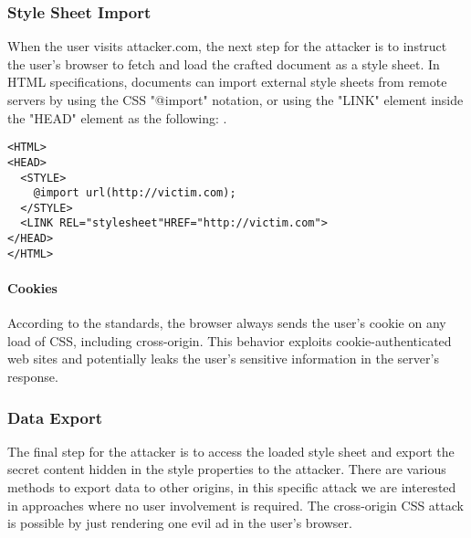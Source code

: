 \documentclass{acm_proc_article-sp}
\begin{document}
\subsubsection{Style Sheet Import}
When the user visits attacker.com, the next step for the attacker is to instruct the user's browser to fetch and load the crafted document as a style sheet. In HTML specifications\cite{html}, documents can import external style sheets from remote servers by using the CSS "@import" notation, or using the "LINK" element inside the "HEAD" element as the following: .
\begin{verbatim}
<HTML>
<HEAD>
  <STYLE>
    @import url(http://victim.com);
  </STYLE>
  <LINK REL="stylesheet"HREF="http://victim.com">
</HEAD>
</HTML>
\end{verbatim}
\paragraph{Cookies}
According to the standards, the browser always sends the user's cookie on any load of CSS, including cross-origin. This behavior exploits cookie-authenticated web sites and potentially leaks the user's sensitive information in the server's response.

\subsubsection{Data Export}
The final step for the attacker is to access the loaded style sheet and export the secret content hidden in the style properties to the attacker. There are various methods to export data to other origins, in this specific attack we are interested in approaches where no user involvement is required. The cross-origin CSS attack is possible by just rendering one evil ad in the user's browser. 
\end{document}
